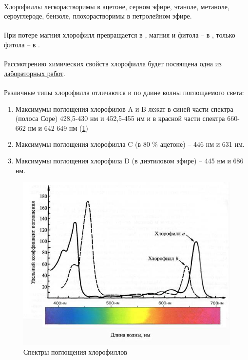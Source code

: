 \paragraph*{}Хлорофиллы легкорастворимы в ацетоне, серном эфире, этаноле, метаноле, сероуглероде, бензоле, плохорастворимы в петролейном эфире.

\paragraph*{}При потере магния хлорофилл превращается в , магния и фитола -- в , только фитола -- в .

\paragraph*{}Рассмотрению химических свойств хлорофилла будет посвящена одна из \hyperlink{chem_hlorophil}{лабораторных работ}.


\paragraph*{}Различные типы хлорофилла отличаются и по длине волны поглощаемого света:

\begin{enumerate}

\item Максимумы поглощения хлорофилов A и B лежат в синей части спектра (полоса Соре) 428,5-430 нм и 452,5-455 нм и в красной части спектра 660-662 нм и 642-649 нм (\ris \ref{hlspectr})
\item Максимумы поглощения хлорофилла C (в 80 \% ацетоне) -- 446 нм и 631 нм. 
\item Максимумы поглощения хлорофила D (в диэтиловом эфире) -- 445 нм и 686 нм.

\end{enumerate}

\begin{figure}
  \centering
       \includegraphics[width=0.6\linewidth]{pictures/hlspectr}
\caption{Спектры поглощения хлорофиллов}
\label{hlspectr}
\end{figure}

